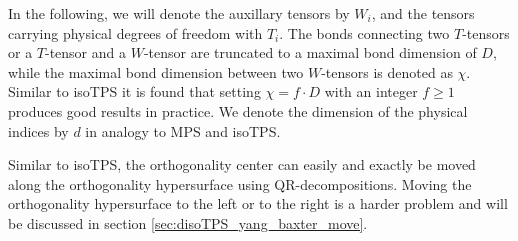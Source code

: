 In the following, we will denote the auxillary tensors by $W_i$, and the tensors carrying physical degrees of freedom with $T_i$. The bonds connecting two $T$-tensors or a $T$-tensor and a $W$-tensor are truncated to a maximal bond dimension of $D$, while the maximal bond dimension between two $W$-tensors is denoted as $\chi$. Similar to isoTPS it is found that setting $\chi=f\cdot D$ with an integer $f\ge1$ produces good results in practice. We denote the dimension of the physical indices by $d$ in analogy to MPS and isoTPS. \par
Similar to isoTPS, the orthogonality center can easily and exactly be moved along the orthogonality hypersurface using QR-decompositions. Moving the orthogonality hypersurface to the left or to the right is a harder problem and will be discussed in section \ref{sec:disoTPS_yang_baxter_move}. \par
